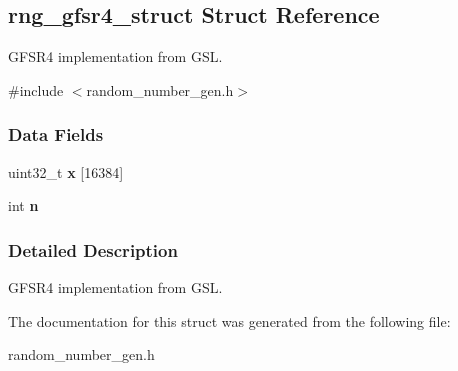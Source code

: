 \hypertarget{structrng__gfsr4__struct}{}\subsection{rng\+\_\+gfsr4\+\_\+struct Struct Reference}
\label{structrng__gfsr4__struct}


G\+F\+S\+R4 implementation from G\+SL.  




{\ttfamily \#include $<$random\+\_\+number\+\_\+gen.\+h$>$}

\subsubsection*{Data Fields}
\begin{DoxyCompactItemize}
\item 
\mbox{\label{structrng__gfsr4__struct_a5622e035e156e3f0d1145dbefba83529}} 
uint32\+\_\+t {\bfseries x} \mbox{[}16384\mbox{]}
\item 
\mbox{\label{structrng__gfsr4__struct_ab5faf71596de1108c759669cf4345d37}} 
int {\bfseries n}
\end{DoxyCompactItemize}


\subsubsection{Detailed Description}
G\+F\+S\+R4 implementation from G\+SL. 

The documentation for this struct was generated from the following file\+:\begin{DoxyCompactItemize}
\item 
random\+\_\+number\+\_\+gen.\+h\end{DoxyCompactItemize}
